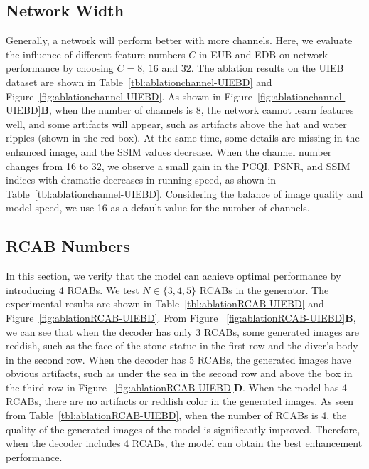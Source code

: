 \documentclass[utf8]{FrontiersinHarvard} %
\begin{document}
\subsection{Network Width}
Generally, a network will perform better with more channels. Here, we evaluate the influence of different feature numbers $C$ in EUB and EDB on network performance by choosing $C=8$, $16$ and $32$. The ablation results on the UIEB dataset are shown in Table~\ref{tbl:ablationchannel-UIEBD} and Figure~\ref{fig:ablationchannel-UIEBD}. As shown in Figure~\ref{fig:ablationchannel-UIEBD}\textbf{B}, when the number of channels is 8, the network cannot learn features well, and some artifacts will appear, such as artifacts above the hat and water ripples (shown in the red box). At the same time, some details are missing in the enhanced image, and the SSIM values decrease. {When the channel number changes from 16 to 32, we observe a small gain in the PCQI, PSNR, and SSIM indices with dramatic decreases in running speed}, as shown in Table~\ref{tbl:ablationchannel-UIEBD}. Considering the balance of image quality and model speed, we use 16 as a default value for the number of channels. 

\subsection{RCAB Numbers}
In this section, we verify that the model can achieve optimal performance by introducing 4 RCABs. We test $N \in\{3,4,5\}$ RCABs in the generator. The experimental results are shown in Table~\ref{tbl:ablationRCAB-UIEBD} and Figure~\ref{fig:ablationRCAB-UIEBD}. From Figure ~\ref{fig:ablationRCAB-UIEBD}\textbf{B}, we can see that when the decoder has only 3 RCABs, some generated images are reddish, such as the face of the stone statue in the first row and the diver's body in the second row. When the decoder has 5 RCABs, the generated images have obvious artifacts, such as under the sea in the second row and above the box in the third row in Figure ~\ref{fig:ablationRCAB-UIEBD}\textbf{D}. When the model has 4 RCABs, there are no artifacts or reddish color in the generated images. As seen from Table~\ref{tbl:ablationRCAB-UIEBD}, when the number of RCABs is 4, the quality of the generated images of the model is significantly improved. Therefore, when the decoder includes 4 RCABs, the model can obtain the best enhancement performance.
\end{document}
